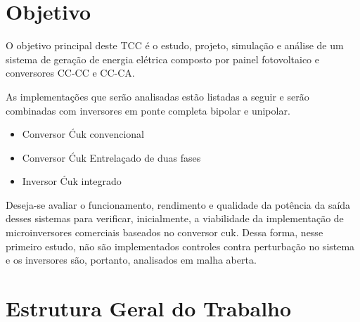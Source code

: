 \documentclass[
	12pt,				%
	openright,			%
	twoside,			%
	a4paper,			%
	english,			%
	french,				%
	spanish,			%
	brazil,				%
	]{abntex2}
\begin{document}
%
%
%

\section{Objetivo}

O objetivo principal deste TCC é o estudo, projeto, simulação e análise de um sistema de geração de energia elétrica composto por painel fotovoltaico e conversores CC-CC e CC-CA. 

As implementações que serão analisadas estão listadas a seguir e serão combinadas com inversores em ponte completa bipolar e unipolar.

\begin{itemize}%
	\item Conversor Ćuk convencional
	\item Conversor Ćuk Entrelaçado de duas fases
	\item Inversor Ćuk integrado
\end{itemize}

Deseja-se avaliar o funcionamento, rendimento e qualidade da potência da saída desses sistemas para verificar, inicialmente, a viabilidade da implementação de microinversores comerciais baseados no conversor cuk. Dessa forma, nesse primeiro estudo, não são implementados controles contra perturbação no sistema e os inversores são, portanto, analisados em malha aberta.

\section{Estrutura Geral do Trabalho}
\end{document}
